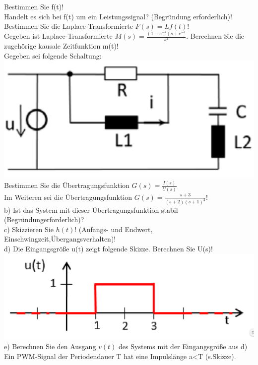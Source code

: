 \documentclass[A4]{scrartcl}
\begin{document}
  Bestimmen Sie f(t)!\\
  Handelt es sich bei f(t) um ein Leistungssignal? (Begründung erforderlich)!\\
  Bestimmen Sie die Laplace-Transformierte $F(s) = L{f(t)}$!\\
  Gegeben ist Laplace-Transformierte $M(s) = \frac{(1-e^{-s})s+e^{-s}}{s^2}$. Berechnen Sie die zugehörige kausale Zeitfunktion m(t)!\\
  \newpage
  Gegeben sei folgende Schaltung:\\
  \includegraphics{Schaltung3.png}\\
  Bestimmen Sie die Übertragungsfunktion $G(s) = \frac{I(s)}{U(s)}$\\
  Im Weiteren sei die Übertragungsfunktion $G(s) = \frac{s+3}{(s+2)(s+1)^2}$!\\
  b) Ist das System mit dieser Übertragungsfunktion stabil (Begründungerforderlich)?\\
  c) Skizzieren Sie $h(t)$! (Anfangs- und Endwert, Einschwingzeit,Übergangsverhalten)!\\
  d) Die Eingangsgröße u(t) zeigt folgende Skizze. Berechnen Sie U(s)! \\
  \includegraphics{zeitfunktion5.png}\\
  e) Berechnen Sie den Ausgang $v(t)$ des Systems mit der Eingangsgröße aus d)\\
  \newpage
  Ein PWM-Signal der Periodendauer T hat eine Impulslänge a<T (s.Skizze).\\
\end{document}
